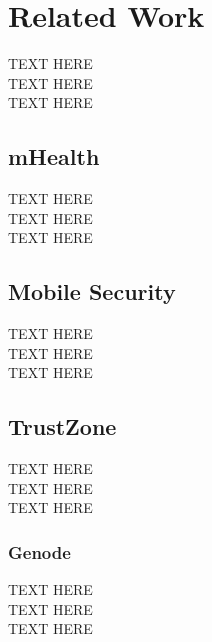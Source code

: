 
% 
% 
\section{Related Work}

TEXT HERE\\
TEXT HERE\\
TEXT HERE

\subsection{mHealth}

TEXT HERE\\
TEXT HERE\\
TEXT HERE

\subsection{Mobile Security}

TEXT HERE\\
TEXT HERE\\
TEXT HERE

\subsection{TrustZone}

TEXT HERE\\
TEXT HERE\\
TEXT HERE

\subsubsection*{Genode\\}
TEXT HERE\\
TEXT HERE\\
TEXT HERE

